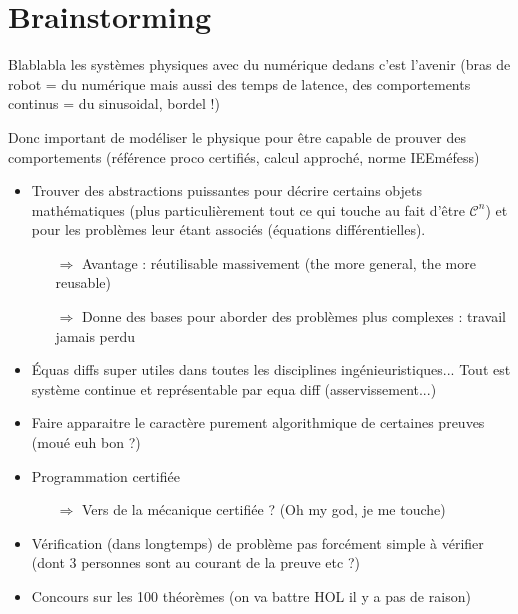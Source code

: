 \documentclass[11pt]{article}
\begin{document}
\section{Brainstorming}

Blablabla les systèmes physiques avec du numérique dedans c'est l'avenir (bras de robot = du numérique mais aussi des temps de latence, des comportements continus = du sinusoidal, bordel !)

Donc important de modéliser le physique pour être capable de prouver des comportements (référence proco certifiés, calcul approché, norme IEEméfess)   

\begin{itemize}
  \item Trouver des abstractions puissantes pour décrire certains objets mathématiques (plus particulièrement tout ce qui touche au fait d'être $\mathcal{C}^n$) et pour les problèmes leur étant associés (équations différentielles).
  \begin{itemize}
    \item[$\Rightarrow$] Avantage : réutilisable massivement (the more general, the more reusable)
    \item[$\Rightarrow$] Donne des bases pour aborder des problèmes plus complexes : travail jamais perdu
  \end{itemize}

  \item Équas diffs super utiles dans toutes les disciplines ingénieuristiques... Tout est système continue et représentable par equa diff (asservissement...)

  \item Faire apparaitre le caractère purement algorithmique de certaines preuves (moué euh bon ?)
  \item Programmation certifiée
  \begin{itemize}
    \item[$\Rightarrow$] Vers de la mécanique certifiée ? (Oh my god, je me touche)
  \end{itemize}

  \item Vérification (dans longtemps) de problème pas forcément simple à vérifier (dont 3 personnes sont au courant de la preuve etc ?)
  \item Concours sur les 100 théorèmes (on va battre HOL il y a pas de raison)
\end{itemize}


\end{document}
